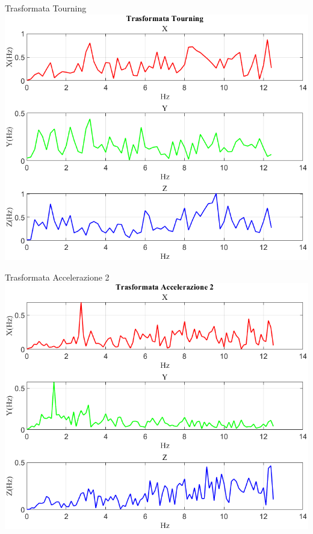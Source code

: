 \documentclass[beamer]{standalone}
\begin{document}
	\begin{frame}{{Trasformata Tourning}}
		\centering\includegraphics[height=.8\textheight]{figure/Acc/Trasformata/Trasformata Tourning}
	\end{frame}
	
	\begin{frame}{{Trasformata Accelerazione 2}}
		\centering\includegraphics[height=.8\textheight]{figure/Acc/Trasformata/Trasformata Accelerazione 2}
	\end{frame}
	
\end{document}
